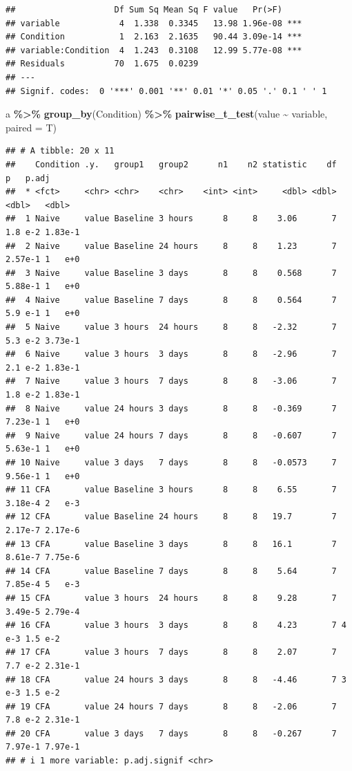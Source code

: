\documentclass[
]{book}
\newenvironment{Shaded}{\begin{snugshade}}{\end{snugshade}}
\newcommand{\AttributeTok}[1]{\textcolor[rgb]{0.13,0.29,0.53}{#1}}
\newcommand{\FunctionTok}[1]{\textcolor[rgb]{0.13,0.29,0.53}{\textbf{#1}}}
\newcommand{\NormalTok}[1]{#1}
\newcommand{\SpecialCharTok}[1]{\textcolor[rgb]{0.81,0.36,0.00}{\textbf{#1}}}
\begin{document}
\begin{verbatim}
##                    Df Sum Sq Mean Sq F value   Pr(>F)    
## variable            4  1.338  0.3345   13.98 1.96e-08 ***
## Condition           1  2.163  2.1635   90.44 3.09e-14 ***
## variable:Condition  4  1.243  0.3108   12.99 5.77e-08 ***
## Residuals          70  1.675  0.0239                     
## ---
## Signif. codes:  0 '***' 0.001 '**' 0.01 '*' 0.05 '.' 0.1 ' ' 1
\end{verbatim}

\begin{Shaded}
\begin{Highlighting}[]
\NormalTok{a }\SpecialCharTok{\%\textgreater{}\%}
  \FunctionTok{group\_by}\NormalTok{(Condition) }\SpecialCharTok{\%\textgreater{}\%} 
  \FunctionTok{pairwise\_t\_test}\NormalTok{(value }\SpecialCharTok{\textasciitilde{}}\NormalTok{ variable, }\AttributeTok{paired =}\NormalTok{ T) }
\end{Highlighting}
\end{Shaded}

\begin{verbatim}
## # A tibble: 20 x 11
##    Condition .y.   group1   group2      n1    n2 statistic    df       p   p.adj
##  * <fct>     <chr> <chr>    <chr>    <int> <int>     <dbl> <dbl>   <dbl>   <dbl>
##  1 Naive     value Baseline 3 hours      8     8    3.06       7 1.8 e-2 1.83e-1
##  2 Naive     value Baseline 24 hours     8     8    1.23       7 2.57e-1 1   e+0
##  3 Naive     value Baseline 3 days       8     8    0.568      7 5.88e-1 1   e+0
##  4 Naive     value Baseline 7 days       8     8    0.564      7 5.9 e-1 1   e+0
##  5 Naive     value 3 hours  24 hours     8     8   -2.32       7 5.3 e-2 3.73e-1
##  6 Naive     value 3 hours  3 days       8     8   -2.96       7 2.1 e-2 1.83e-1
##  7 Naive     value 3 hours  7 days       8     8   -3.06       7 1.8 e-2 1.83e-1
##  8 Naive     value 24 hours 3 days       8     8   -0.369      7 7.23e-1 1   e+0
##  9 Naive     value 24 hours 7 days       8     8   -0.607      7 5.63e-1 1   e+0
## 10 Naive     value 3 days   7 days       8     8   -0.0573     7 9.56e-1 1   e+0
## 11 CFA       value Baseline 3 hours      8     8    6.55       7 3.18e-4 2   e-3
## 12 CFA       value Baseline 24 hours     8     8   19.7        7 2.17e-7 2.17e-6
## 13 CFA       value Baseline 3 days       8     8   16.1        7 8.61e-7 7.75e-6
## 14 CFA       value Baseline 7 days       8     8    5.64       7 7.85e-4 5   e-3
## 15 CFA       value 3 hours  24 hours     8     8    9.28       7 3.49e-5 2.79e-4
## 16 CFA       value 3 hours  3 days       8     8    4.23       7 4   e-3 1.5 e-2
## 17 CFA       value 3 hours  7 days       8     8    2.07       7 7.7 e-2 2.31e-1
## 18 CFA       value 24 hours 3 days       8     8   -4.46       7 3   e-3 1.5 e-2
## 19 CFA       value 24 hours 7 days       8     8   -2.06       7 7.8 e-2 2.31e-1
## 20 CFA       value 3 days   7 days       8     8   -0.267      7 7.97e-1 7.97e-1
## # i 1 more variable: p.adj.signif <chr>
\end{verbatim}
\end{document}
